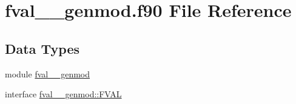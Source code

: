 \hypertarget{fval____genmod_8f90}{\section{fval\+\_\+\+\_\+genmod.\+f90 File Reference}
\label{fval____genmod_8f90}
}
\subsection*{Data Types}
\begin{DoxyCompactItemize}
\item 
module \hyperlink{classfval____genmod}{fval\+\_\+\+\_\+genmod}
\item 
interface \hyperlink{interfacefval____genmod_1_1FVAL}{fval\+\_\+\+\_\+genmod\+::\+F\+V\+A\+L}
\end{DoxyCompactItemize}
